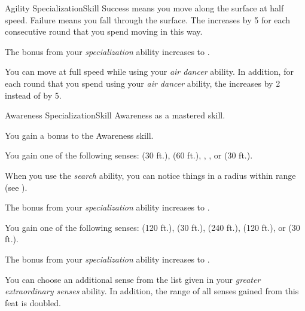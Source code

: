 \begin{feat}{Agility Specialization}{Skill}
        Success means you move along the surface at half speed.
        Failure means you fall through the surface.
        The  increases by 5 for each consecutive round that you spend moving in this way.

         The bonus from your \textit{specialization} ability increases to .

         You can move at full speed while using your \textit{air dancer} ability.
        In addition, for each round that you spend using your \textit{air dancer} ability, the  increases by 2 instead of by 5.
    \end{feat}

    \begin{feat}{Awareness Specialization}{Skill}
        \featpre Awareness as a mastered skill.

         You gain a  bonus to the Awareness skill.

         You gain one of the following senses:  (30 ft.),  (60 ft.), , , or  (30 ft.).

         When you use the \textit{search} ability, you can notice things in a \areasmall radius within \rngshort range (see ).

         The bonus from your \textit{specialization} ability increases to .

         You gain one of the following senses:  (120 ft.),  (30 ft.),  (240 ft.),  (120 ft.), or  (30 ft.).

         The bonus from your \textit{specialization} ability increases to .

         You can choose an additional sense from the list given in your \textit{greater extraordinary senses} ability.
        In addition, the range of all senses gained from this feat is doubled.
    \end{feat}

